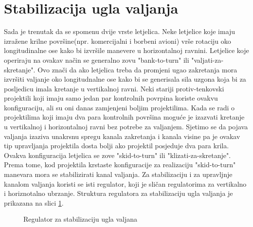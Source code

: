 \section{Stabilizacija ugla valjanja}
Sada je trenutak da se spomenu dvije vrste letjelica. Neke letjelice koje imaju izražene 
krilne površine(npr. komercijalni i borbeni avioni) vrše rotaciju oko longitudinalne ose kako 
bi izvršile manevere u horizontalnoj ravnini. Letjelice koje operiraju na ovakav način se 
generalno zovu "bank-to-turn" ili "valjati-za-skretanje". Ovo znači da ako letjelica 
treba da promjeni ugao zakretanja mora izvršiti valjanje oko longitudnalne ose kako bi se 
generisala sila uzgona koja bi za posljedicu imala kretanje u vertikalnoj ravni. Neki stariji 
protiv-tenkovski projektili koji imaju samo jedan par kontrolnih povrpina koriste ovakvu konfiguraciju, ali 
su oni danas zamjenjeni boljim projektilima. Kada se radi o projektilima koji imaju dva para kontrolnih površina 
moguće je izazvati kretanje u vertikalnoj i horizontalnoj ravni bez potrebe za valjanjem. Sjetimo se da 
pojava valjanja izaziva unakrsnu spregu kanala zakretanja i kanala visine pa je ovakav tip upravljanja projektila dosta 
bolji ako projektil posjeduje dva para krila. Ovakva konfiguracija letjelica se zove "skid-to-turn" ili "klizati-za-skretanje". 
Prema tome, kod projektila krstaste konfiguracije za realizaciju "skid-to-turn" manevara mora se stabilizirati kanal valjanja. 
Za stabilizaciju i za upravljnje kanalom valjanja koristi se isti regulator, koji je sličan regulatorima za vertikalno i 
horiznotalno ubrzanje. Struktura regulatora za stabilizaciju ugla valjanja je prikazana na slici \ref{fig:rollStab}.
\begin{figure}[!ht]
    \centering
    \caption{Regulator za stabilizaciju ugla valjana}
    \label{fig:rollStab}
\end{figure}
